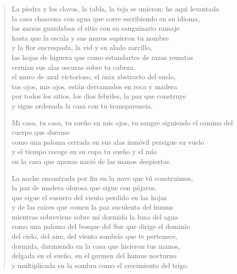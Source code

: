 \documentclass[12pt]{article}
\begin{document}
\clearpage
{}
\begin{verse}

La piedra y los clavos, la tabla, la teja se unieron: he aquí levantada\\
la casa chascona con agua que corre escribiendo en su idioma,\\
las zarzas guardaban el sitio con su sanguinario ramaje\\
hasta que la escala y sus muros supieron tu nombre\\
y la flor encrespada, la vid y su alado zarcillo,\\
las hojas de higuera que como estandartes de razas remotas\\
cernían sus alas oscuras sobre tu cabeza,\\
el muro de azul victorioso, el ónix abstracto del suelo,\\
tus ojos, mis ojos, están derramados en roca y madera\\
por todos los sitios, los días febriles, la paz que construye\\
y sigue ordenada la casa con tu transparencia.  

Mi casa, tu casa, tu sueño en mis ojos, tu sangre siguiendo el camino del cuerpo que duerme\\
como una paloma cerrada en sus alas inmóvil persigue su vuelo\\
y el tiempo recoge en su copa tu sueño y el mío\\
en la casa que apenas nació de las manos despiertas.  

La noche encontrada por fin en la nave que tú construimos,\\
la paz de madera olorosa que sigue con pájaros,\\
que sigue el susurro del viento perdido en las hojas\\
y de las raíces que comen la paz suculenta del humus\\
mientras sobreviene sobre mí dormida la luna del agua\\
como una paloma del bosque del Sur que dirige el dominio\\
del cielo, del aire, del viento sombrío que te pertenece,\\
dormida, durmiendo en la casa que hicieron tus manos,\\
delgada en el sueño, en el germen del humus nocturno\\
y multiplicada en la sombra como el crecimiento del trigo.  


\end{verse}
\end{document}
